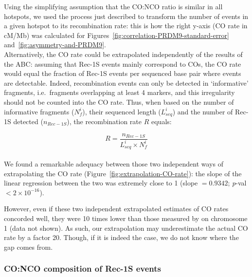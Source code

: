 Using the simplifying assumption that the CO:NCO ratio is similar in all hotspots, we used the process just described to transform the number of events in a given hotspot to its recombination rate: this is how the right y-axis (CO rate in cM/Mb) was calculated for Figures~\ref{fig:correlation-PRDM9-standard-error} and~\ref{fig:asymmetry-and-PRDM9}.\\

Alternatively, the CO rate could be extrapolated independently of the results of the ABC\@: assuming that Rec-1S events mainly correspond to COs, the CO rate would equal the fraction of Rec-1S events per sequenced base pair where events are detectable.
Indeed, recombination events can only be detected in ‘informative’ fragments, i.e.\ fragments overlapping at least 4 markers, and this irregularity should not be counted into the CO rate.
Thus, when based on the number of informative fragments ($N^{i}_{f}$), their sequenced length ($L^{i}_{seq}$) and the number of Rec-1S detected ($n_{Rec-1S}$), the recombination rate $R$ equals:

\begin{equation*}
    R = \frac{n_{Rec-1S}}{L^{i}_{seq} \times N^{i}_{f}}
\end{equation*}\\



We found a remarkable adequacy between those two independent ways of extrapolating the CO rate (Figure~\ref{fig:extrapolation-CO-rate}): the slope of the linear regression between the two was extremely close to 1 (slope $ =0.9342$; \textit{p}-val $< 2 \times 10^{-16}$).


However, even if these two independent extrapolated estimates of CO rates concorded well, they were 10 times lower than those measured by \citet{paigen2008recombinational} on chromosome 1 (data not shown). 
As such, our extrapolation may underestimate the actual CO rate by a factor 20. Though, if it is indeed the case, we do not know where the gap comes from.






\subsubsection{CO:NCO composition of Rec-1S events}

